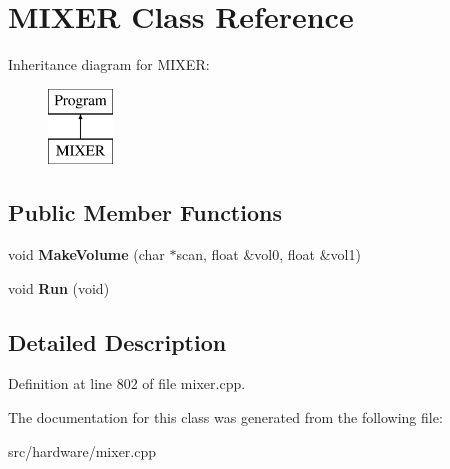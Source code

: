 \hypertarget{classMIXER}{\section{M\-I\-X\-E\-R Class Reference}
\label{classMIXER}
}
Inheritance diagram for M\-I\-X\-E\-R\-:\begin{figure}[H]
\begin{center}
\leavevmode
\includegraphics[height=2.000000cm]{classMIXER}
\end{center}
\end{figure}
\subsection*{Public Member Functions}
\begin{DoxyCompactItemize}
\item 
\hypertarget{classMIXER_a85b8e090dc7b9a2c6d3fdf0935e7f824}{void {\bfseries Make\-Volume} (char $\ast$scan, float \&vol0, float \&vol1)}\label{classMIXER_a85b8e090dc7b9a2c6d3fdf0935e7f824}

\item 
\hypertarget{classMIXER_a5043b553511d83536361a96111c17a31}{void {\bfseries Run} (void)}\label{classMIXER_a5043b553511d83536361a96111c17a31}

\end{DoxyCompactItemize}


\subsection{Detailed Description}


Definition at line 802 of file mixer.\-cpp.



The documentation for this class was generated from the following file\-:\begin{DoxyCompactItemize}
\item 
src/hardware/mixer.\-cpp\end{DoxyCompactItemize}
